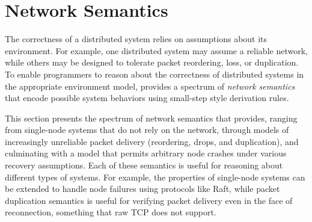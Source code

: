 \section{Network Semantics}\label{sec:verdi:nwsem}

The correctness of a distributed system relies on assumptions about its
environment.
%
For example, one distributed system may assume a reliable network, while
others may be designed to tolerate packet reordering, loss, or
duplication.
%
To enable programmers to reason about the correctness of distributed
systems in the appropriate environment model, \Verdi provides a spectrum of
\emph{network semantics} that encode possible system behaviors using
small-step style derivation rules.

This section presents the spectrum of network semantics that \Verdi
provides, ranging from single-node systems that do not
rely on the network, through models of increasingly unreliable packet
delivery (reordering, drops, and duplication), and culminating with a
model that permits arbitrary node crashes under various recovery
assumptions.
%
Each of these semantics is useful for reasoning about different types of
systems.
%
For example, the properties of single-node systems can be extended
to handle node failures using protocols like
Raft, while packet duplication semantics is useful for verifying
packet delivery even in the face of reconnection, something that
raw TCP does not support.


